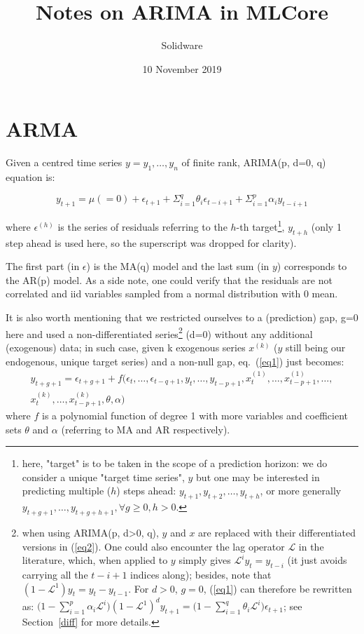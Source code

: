 \documentclass{article}
\begin{document}
\title{Notes on ARIMA in MLCore}
\author{Solidware}
\date{10 November 2019}
\maketitle


\section{ARMA}

Given a centred time series $y=y_1, \ldots, y_n$ of finite rank, ARIMA(p, d=0, q) equation is:

\begin{equation}
  \label{eq1}
y_{t+1}=\mu(=0)+\epsilon_{t+1}+\Sigma_{i=1}^{q}\theta_{i}\epsilon_{t-i+1}+\Sigma_{i=1}^{p}\alpha_{i}y_{t-i+1} 
\end{equation}

where $\epsilon^{(h)}$ is the series of residuals referring to the $h$-th target\footnote{here, "target" is to be taken in the scope of a prediction horizon: we do consider a unique "target time series", $y$ but one may be interested in predicting multiple ($h$) steps ahead: $y_{t+1}, y_{t+2}, \dots, y_{t+h}$, or more generally $y_{t+g+1},\dots, y_{t+g+h+1}, \forall g\geq 0, h>0$.}, $y_{t+h}$ (only 1 step ahead is used here, so the superscript was dropped for clarity). 

The first part (in $\epsilon$) is the MA(q) model and the last sum (in $y$) corresponds to the AR(p) model. As a side note, one could verify that the residuals are not correlated and iid variables sampled from a normal distribution with 0 mean.

It is also worth mentioning that we restricted ourselves to a (prediction) gap, g=0 here and used a non-differentiated series\footnote{when using ARIMA(p, d>0, q), $y$ and $x$ are replaced with their differentiated versions in (\ref{eq2}). One could also encounter the lag operator $\mathcal{L}$ in the literature, which, when applied to $y$ simply gives $\mathcal{L}^iy_t=y_{t-i}$ (it just avoids carrying all the $t-i+1$ indices along); besides, note that $(1-\mathcal{L}^1)y_t=y_t-y_{t-1}$. For $d>0$, $g=0$, (\ref{eq1}) can therefore be rewritten as: $\big(1-\sum_{i=1}^p \alpha_i \mathcal{L}^i \big) (1-\mathcal{L}^1)^dy_{t+1} = \big(1-\sum_{i=1}^q \theta_i \mathcal{L}^i \big)\epsilon_{t+1}$; see Section~\ref{diff} for more details.} (d=0) without any additional (exogenous) data; in such case, given k exogenous series $x^{(k)}$ ($y$ still being our endogenous, unique target series) and a non-null gap, eq.~(\ref{eq1}) just becomes:
\begin{equation}
\begin{split}
\label{eq2}
y_{t+g+1} = \epsilon_{t+g+1} + f(\epsilon_{t}, \dots, \epsilon_{t-q+1}, y_{t},\dots, y_{t-p+1}, x^{(1)}_{t}, \dots, x^{(1)}_{t-p+1}, \dots, \\
x^{(k)}_{t}, \dots, x^{(k)}_{t-p+1}, \theta, \alpha)
\end{split}
\end{equation}
where $f$ is a polynomial function of degree 1 with more variables and coefficient sets $\theta$ and $\alpha$ (referring to MA and AR respectively).
\end{document}
